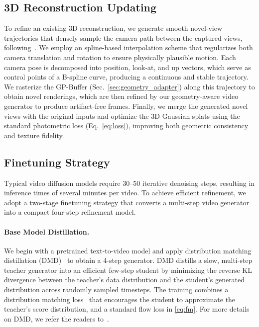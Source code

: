 \subsection{3D Reconstruction Updating}
\label{subsec:refining_3d}
To refine an existing 3D reconstruction, we generate smooth novel-view trajectories that densely sample the camera path between the captured views, following~\cite{fischer2025flowr,Wu2025GenFusion}. We employ an spline-based interpolation scheme that regularizes both camera translation and rotation to ensure physically plausible motion. 
Each camera pose is decomposed into position, look-at, and up vectors, which serve as control points of a B-spline curve, producing a continuous and stable trajectory. 
We rasterize the GP-Buffer (Sec.~\ref{sec:geometry_adapter}) along this trajectory to obtain novel renderings, which are then refined by our geometry-aware video generator to produce artifact-free frames. 
Finally, we merge the generated novel views with the original inputs and optimize the 3D Gaussian splats using the standard photometric loss (Eq.~\ref{eq:loss}), improving both geometric consistency and texture fidelity.



\subsection{Finetuning Strategy}
Typical video diffusion models require 30–50 iterative denoising steps, resulting in inference times of several minutes per video. To achieve efficient refinement, we adopt a two-stage finetuning strategy that converts a multi-step video generator into a compact four-step refinement model. 
\paragraph{Base Model Distillation.}
We begin with a pretrained text-to-video model and apply distribution matching distillation (DMD)~\cite{yin2024dmd,yin2024onestep} to obtain a 4-step generator. DMD distills a slow, multi-step teacher generator into an efficient few-step student by minimizing the reverse KL divergence between the teacher’s data distribution and the student’s generated distribution across randomly sampled timesteps. The training combines a distribution matching loss~\cite{yin2024onestep} that encourages the student to approximate the teacher’s score distribution, and a standard flow loss in \cref{eq:fm}. For more details on DMD, we refer the readers to~\cite{yin2025causvid}.
